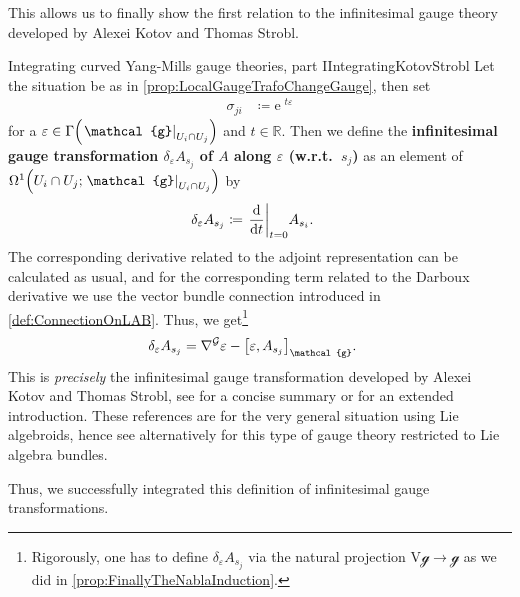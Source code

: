 \documentclass[reqno,a4paper,oneside]{amsart}
\newcommand{\e}{\ensuremath{\mathrm{e\;\!}}}
\theoremstyle{plain}
\theoremstyle{remark}
\theoremstyle{definition}
\begin{document}
This allows us to finally show the first relation to the infinitesimal gauge theory developed by Alexei Kotov and Thomas Strobl.

\begin{remarks}{Integrating curved Yang-Mills gauge theories, part I}{IntegratingKotovStrobl}
Let the situation be as in \ref{prop:LocalGaugeTrafoChangeGauge}, then set 
\begin{align*}
\sigma_{ji}
&\coloneqq
\e^{t \varepsilon}
\end{align*}
for a $\varepsilon \in \Gamma\mleft( \mleft.\mathcal{g}\mright|_{U_i \cap U_j} \mright)$ and $t \in \mathbb{R}$. Then we define the \textbf{infinitesimal gauge transformation $\delta_\varepsilon A_{s_j}$ of $A$ along $\varepsilon$ (w.r.t.\ $s_j$)} as an element of $\Omega^1\mleft( U_i \cap U_j; \mleft.\mathcal{g}\mright|_{U_i \cap U_j} \mright)$ by
\begin{align*}
\delta_\varepsilon A_{s_j}
&\coloneqq
\mleft.\frac{\mathrm{d}}{\mathrm{d}t}\mright|_{t=0} A_{s_i}.
\end{align*}
The corresponding derivative related to the adjoint representation can be calculated as usual, and for the corresponding term related to the Darboux derivative we use the vector bundle connection introduced in \ref{def:ConnectionOnLAB}. Thus, we get\footnote{Rigorously, one has to define $\delta_\varepsilon A_{s_j}$ via the natural projection $\mathrm{V}\mathcal{g} \to \mathcal{g}$ as we did in \ref{prop:FinallyTheNablaInduction}.}
\begin{align*}
\delta_\varepsilon A_{s_j}
&=
\nabla^{\mathcal{G}} \varepsilon 
	- \mleft[ \varepsilon, A_{s_j} \mright]_{\mathcal{g}}.
\end{align*}
This is \textit{precisely} the infinitesimal gauge transformation developed by Alexei Kotov and Thomas Strobl, see \cite{CurvedYMH} for a concise summary or \cite{MyThesis} for an extended introduction. These references are for the very general situation using Lie algebroids, hence see alternatively \cite{My1stpaper} for this type of gauge theory restricted to Lie algebra bundles.

Thus, we successfully integrated this definition of infinitesimal gauge transformations.
\end{remarks}
\end{document}
